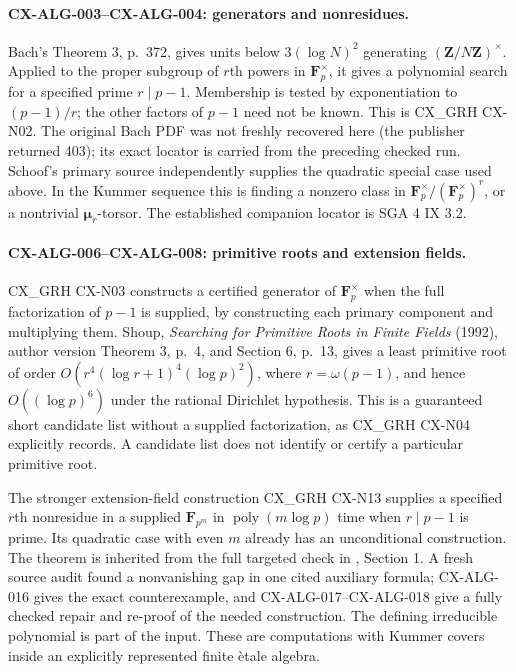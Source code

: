 \documentclass[11pt,a4paper]{article}
\begin{document}
\paragraph{CX-ALG-003--CX-ALG-004: generators and nonresidues.}
Bach's Theorem 3, p.~372, gives units below $3(\log N)^2$ generating
$(\mathbf Z/N\mathbf Z)^\times$. Applied to the proper subgroup of $r$th
powers in $\mathbf F_p^\times$, it gives a polynomial search for a specified
prime $r\mid p-1$. Membership is tested by exponentiation to $(p-1)/r$;
the other factors of $p-1$ need not be known. This is CX\_GRH CX-N02.
The original Bach PDF was not freshly recovered here (the publisher returned
403); its exact locator is carried from the preceding checked run. Schoof's
primary source independently supplies the quadratic special case used above.
In the Kummer sequence this is finding a nonzero class in
$\mathbf F_p^\times/(\mathbf F_p^\times)^r$, or a nontrivial
$\boldsymbol\mu_r$-torsor. The established companion locator is SGA 4 IX 3.2.

\paragraph{CX-ALG-006--CX-ALG-008: primitive roots and extension fields.}
CX\_GRH CX-N03 constructs a certified generator of $\mathbf F_p^\times$ when
the full factorization of $p-1$ is supplied, by constructing each primary
component and multiplying them. Shoup, \emph{Searching for Primitive Roots
in Finite Fields} (1992), author version Theorem 3, p.~4, and Section 6,
p.~13, gives a least primitive root of order
$O(r^4(\log r+1)^4(\log p)^2)$, where $r=\omega(p-1)$,
and hence $O((\log p)^6)$ under the
rational Dirichlet hypothesis. This is a guaranteed short candidate list
without a supplied factorization, as CX\_GRH CX-N04 explicitly records.
A candidate list does not identify or certify a particular primitive root.

The stronger extension-field construction CX\_GRH CX-N13 supplies a specified
$r$th nonresidue in a supplied $\mathbf F_{p^m}$ in
$\operatorname{poly}(m\log p)$ time when $r\mid p-1$ is prime. Its quadratic
case with even $m$ already has an unconditional construction. The theorem is
inherited from the full targeted check in
, Section 1. A fresh source audit
found a nonvanishing gap in one cited auxiliary formula; CX-ALG-016 gives
the exact counterexample, and CX-ALG-017--CX-ALG-018 give a fully checked
repair and re-proof of the needed construction. The defining
irreducible polynomial is part of the input. These are computations with
Kummer covers inside an explicitly represented finite \`etale algebra.
\end{document}
